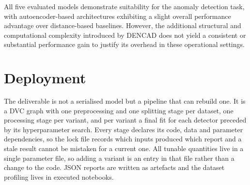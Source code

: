 \documentclass{article}
\begin{document}
All five evaluated models demonstrate suitability for the anomaly detection task, 
with autoencoder-based architectures exhibiting a slight overall performance advantage over distance-based baselines. 
However, the additional structural and computational complexity introduced by DENCAD does not 
yield a consistent or substantial performance gain to justify its overhead in these operational settings.

\section{Deployment}

The deliverable is not a serialised model but a pipeline that can rebuild one. It is a DVC
graph with one preprocessing and one splitting stage per dataset, one processing stage per
variant, and per variant a final fit for each detector preceded by its hyperparameter search. 
Every stage declares its code, data and parameter dependencies, so the lock file
records which inputs produced which report and a stale result cannot be mistaken for a
current one. All tunable quantities live in a single parameter file, so adding a variant is an entry in that file rather than a
change to the code. JSON reports are written as artefacts and the
dataset profiling lives in executed notebooks.
\end{document}
